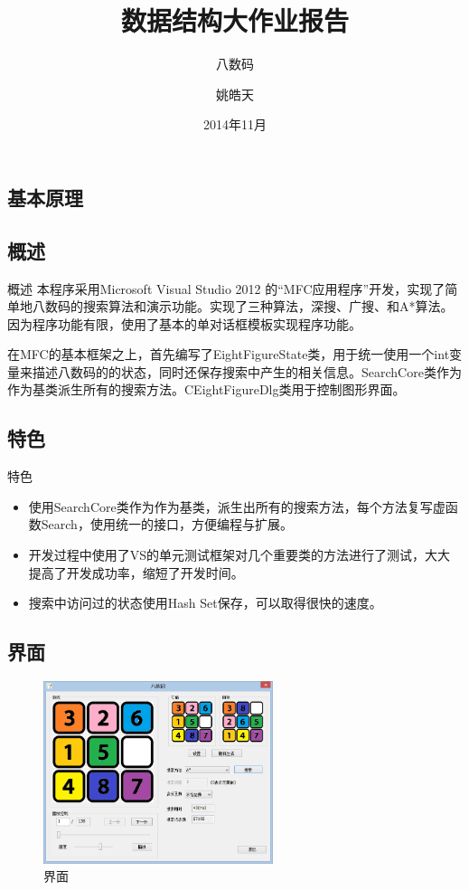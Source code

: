 \documentclass{beamer}
\begin{document}
\title{数据结构大作业报告}
\subtitle{八数码}
\author{姚皓天}
\date{2014年11月}
\subject{数据结构}

\frame{\titlepage}
\begin{frame}
\section{基本原理}
\subsection{概述}
\begin{block}{概述}
本程序采用Microsoft Visual Studio 2012 的“MFC应用程序”开发，实现了简单地八数码的搜索算法和演示功能。实现了三种算法，深搜、广搜、和A*算法。因为程序功能有限，使用了基本的单对话框模板实现程序功能。\par
在MFC的基本框架之上，首先编写了EightFigureState类，用于统一使用一个int变量来描述八数码的的状态，同时还保存搜索中产生的相关信息。SearchCore类作为作为基类派生所有的搜索方法。CEightFigureDlg类用于控制图形界面。
\end{block}
\end{frame}

\begin{frame}
\subsection{特色}
\begin{block}{特色}
\begin{itemize}
\item 使用SearchCore类作为作为基类，派生出所有的搜索方法，每个方法复写虚函数Search，使用统一的接口，方便编程与扩展。
\item 开发过程中使用了VS的单元测试框架对几个重要类的方法进行了测试，大大提高了开发成功率，缩短了开发时间。
\item 搜索中访问过的状态使用Hash Set保存，可以取得很快的速度。
\end{itemize}
\end{block}
\end{frame}

\begin{frame}
\subsection{界面}
\begin{figure}[H]
\centering
\includegraphics[width=0.6\textwidth]{1.png}
\caption{界面} 
\end{figure}
\end{frame}
\end{document}

